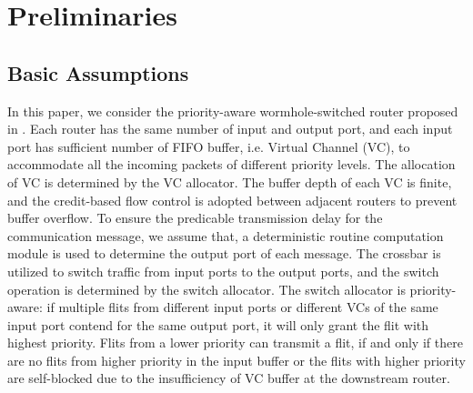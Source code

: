\documentclass[10pt,journal]{IEEEtran}
\begin{document}
\section{Preliminaries}\label{model}
\subsection{Basic Assumptions}
In this paper, we consider the priority-aware wormhole-switched router proposed in \cite{627905}\cite{Shi:2008:RCA:1397757.1397996}\cite{707545}\cite{73}. Each router has the same number of input and output port, and each input port has sufficient number of FIFO buffer, i.e. Virtual Channel (VC), to accommodate all the incoming packets of different priority levels. The allocation of VC is determined by the VC allocator. The buffer depth of each VC is finite, and the credit-based flow control \cite{DaTo04} is adopted between adjacent routers to prevent buffer overflow. To ensure the predicable transmission delay for the communication message, we assume that, a deterministic routine computation module is used to determine the output port of each message. The crossbar is utilized to switch traffic from input ports to the output ports, and the switch operation is determined by the switch allocator. The switch allocator is priority-aware: if multiple flits from different input ports or different VCs of the same input port contend for the same output port, it will only grant the flit with highest priority. Flits from a lower priority can transmit a flit, if and only if there are no flits from higher priority in the input buffer or the flits with higher priority are self-blocked due to the insufficiency of VC buffer at the downstream router.
\end{document}
